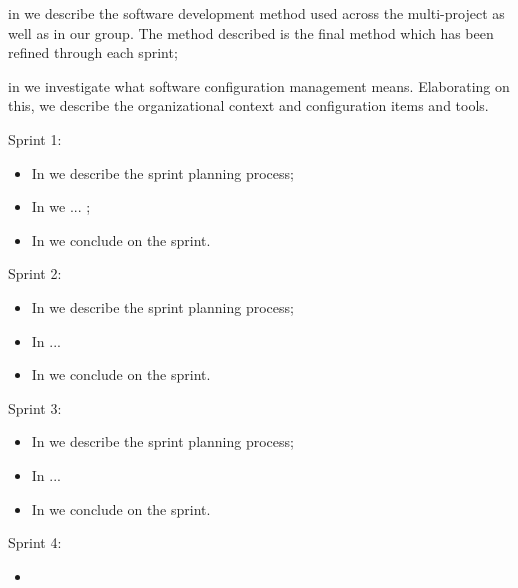 \begin{documentorganization}
  \item in  we describe the software development method used across the multi-project as well as in our group. The method described is the final method which has been refined through each sprint;
  \item in  we investigate what software configuration management means. Elaborating on this, we describe the organizational context and configuration items and tools.
  \item Sprint 1:
  \begin{itemize}
    \item In  we describe the sprint planning process;
    \item In  we ... ;
    \item In  we conclude on the sprint. 
  \end{itemize}
  \item Sprint 2:
  \begin{itemize}
    \item In  we describe the sprint planning process;
    \item In ... \dummy
    \item In  we conclude on the sprint. 
  \end{itemize}
  \item Sprint 3:
  \begin{itemize}
    \item In  we describe the sprint planning process;
    \item In ... \dummy
    \item In  we conclude on the sprint. 
  \end{itemize}
  \item Sprint 4:
  \begin{itemize}
    \item {}
  \end{itemize}
\end{documentorganization}